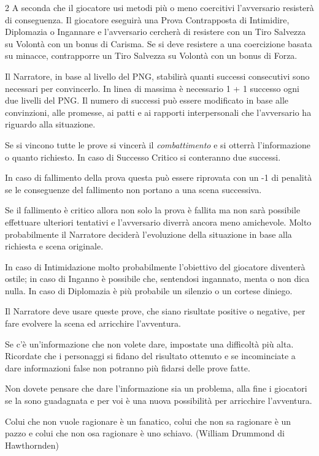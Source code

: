 \begin{multicols}{2}
A seconda che il giocatore usi metodi più o meno coercitivi l'avversario resisterà di conseguenza.
Il giocatore eseguirà una Prova Contrapposta di Intimidire, Diplomazia o Ingannare e l'avversario cercherà di resistere con un Tiro Salvezza su Volontà con un bonus di Carisma.
Se si deve resistere a una coercizione basata su minacce, contrapporre un Tiro Salvezza su Volontà con un bonus di Forza.

Il Narratore, in base al livello del PNG, stabilirà quanti successi consecutivi sono necessari per convincerlo. In linea di massima è necessario 1 + 1 successo ogni due livelli del PNG. Il numero di successi può essere modificato in base alle convinzioni, alle promesse, ai patti e ai rapporti interpersonali che l'avversario ha riguardo alla situazione.

Se si vincono tutte le prove si vincerà il \emph{combattimento} e si otterrà l'informazione o quanto richiesto. In caso di Successo Critico si conteranno due successi.

In caso di fallimento della prova questa può essere riprovata con un -1 di penalità se le conseguenze del fallimento non portano a una scena successiva.

\begin{figure}

\centering
\end{figure}

Se il fallimento è critico allora non solo la prova è fallita ma non sarà possibile effettuare ulteriori tentativi e l'avversario diverrà ancora meno amichevole. Molto probabilmente il Narratore deciderà l'evoluzione della situazione in base alla richiesta e scena originale.

In caso di Intimidazione molto probabilmente l'obiettivo del giocatore diventerà ostile; in caso di Inganno è possibile che, sentendosi ingannato, menta o non dica nulla. In caso di Diplomazia è più probabile un silenzio o un cortese diniego.

Il Narratore deve usare queste prove, che siano risultate positive o negative, per fare evolvere la scena ed arricchire l'avventura.

Se c'è un'informazione che non volete dare, impostate una difficoltà più alta.
Ricordate che i personaggi si fidano del risultato ottenuto e se incominciate a dare informazioni false non potranno più fidarsi delle prove fatte.

Non dovete pensare che dare l'informazione sia un problema, alla fine i giocatori se la sono guadagnata e per voi è una nuova possibilità per arricchire l'avventura.

\end{multicols}

\vfill

\begin{enfasi}{
Colui che non vuole ragionare è un fanatico, colui che non sa ragionare è un pazzo e colui che non osa ragionare è uno schiavo. (William Drummond di Hawthornden)
}\end{enfasi}

\pagebreak


